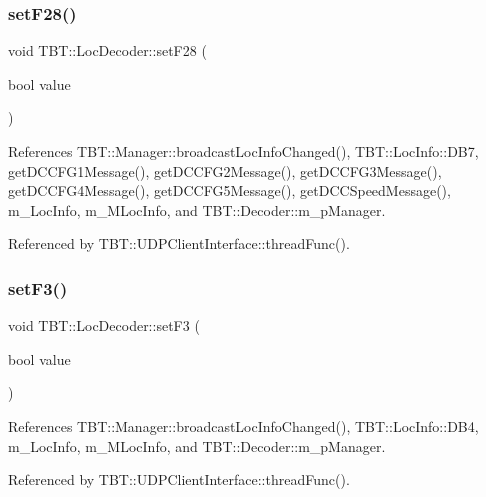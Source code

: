 \subsubsection{\texorpdfstring{set\+F28()}{setF28()}}
{\footnotesize\ttfamily void T\+B\+T\+::\+Loc\+Decoder\+::set\+F28 (\begin{DoxyParamCaption}\item[{bool}]{value }\end{DoxyParamCaption})\hspace{0.3cm}{\ttfamily [inline]}}



References T\+B\+T\+::\+Manager\+::broadcast\+Loc\+Info\+Changed(), T\+B\+T\+::\+Loc\+Info\+::\+D\+B7, get\+D\+C\+C\+F\+G1\+Message(), get\+D\+C\+C\+F\+G2\+Message(), get\+D\+C\+C\+F\+G3\+Message(), get\+D\+C\+C\+F\+G4\+Message(), get\+D\+C\+C\+F\+G5\+Message(), get\+D\+C\+C\+Speed\+Message(), m\+\_\+\+Loc\+Info, m\+\_\+\+M\+Loc\+Info, and T\+B\+T\+::\+Decoder\+::m\+\_\+p\+Manager.



Referenced by T\+B\+T\+::\+U\+D\+P\+Client\+Interface\+::thread\+Func().

\mbox{\label{classTBT_1_1LocDecoder_a6316b9510a9f3552dae834bb6c3deebc_a6316b9510a9f3552dae834bb6c3deebc}} 
\subsubsection{\texorpdfstring{set\+F3()}{setF3()}}
{\footnotesize\ttfamily void T\+B\+T\+::\+Loc\+Decoder\+::set\+F3 (\begin{DoxyParamCaption}\item[{bool}]{value }\end{DoxyParamCaption})\hspace{0.3cm}{\ttfamily [inline]}}



References T\+B\+T\+::\+Manager\+::broadcast\+Loc\+Info\+Changed(), T\+B\+T\+::\+Loc\+Info\+::\+D\+B4, m\+\_\+\+Loc\+Info, m\+\_\+\+M\+Loc\+Info, and T\+B\+T\+::\+Decoder\+::m\+\_\+p\+Manager.



Referenced by T\+B\+T\+::\+U\+D\+P\+Client\+Interface\+::thread\+Func().

\mbox{\label{classTBT_1_1LocDecoder_ae37228489df216238a51e1a22c37d66c_ae37228489df216238a51e1a22c37d66c}} 
